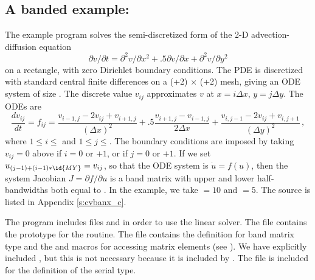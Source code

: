 

\subsection{A banded example: }\label{ss:cvbanx}

The example program  solves the semi-discretized form of
the 2-D advection-diffusion equation
\vspace*{-.1in}
\begin{equation}
\label{eq:adeqn}
\partial v / \partial t = \partial^2 v / \partial x^2
  + .5 \partial v / \partial x + \partial^2 v / \partial y^2
\end{equation}
on a rectangle, with zero Dirichlet boundary conditions. The PDE is 
discretized with standard central finite differences on a 
(+2) $\times$ (+2) mesh, giving an ODE system of size
.  The discrete value $v_{ij}$ approximates $v$ at $x = i \Delta x$,
$y = j \Delta y$. The ODEs are
\begin{equation}
\label{eq:cdiff}
\frac{dv_{ij}}{dt} = f_{ij} =
         \frac{v_{i-1,j} - 2 v_{ij} + v_{i+1,j}}{(\Delta x)^2}
       + .5  \frac{v_{i+1,j} - v_{i-1,j}}{2 \Delta x}
       + \frac{v_{i,j-1} - 2 v_{ij} + v_{i,j+1}}{(\Delta y)^2} \, ,
\end{equation}
where $1 \leq i \leq $ and $1 \leq j \leq $.  The boundary
conditions are imposed by taking $v_{ij} = 0$ above if $i = 0$
or $ + 1$, or if $j = 0$ or $ + 1$. 
If we set $u_{(j-1)+(i-1)*\id{MY}} = v_{ij}$, so that the ODE system is
$\dot{u} = f(u)$, then the system Jacobian $J = \partial f / \partial u$ is
a band matrix with upper and lower half-bandwidths both equal to .
In the example, we take  $= 10$ and  $= 5$.
The source is listed in Appendix \ref{s:cvbanx_c}.

The  program includes files  and
 in order to use the {\cvband} linear solver. The 
file contains the prototype for the  routine. The 
file contains the definition for band matrix type  and the
 and  macros for accessing matrix
elements (see ).
We have explicitly included , but this is not necessary because
it is included by .  The file  is
included for the definition of the serial  type.

